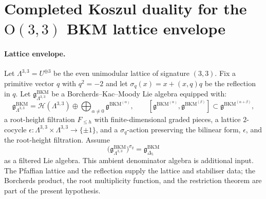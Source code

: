 \providecommand{\Lat}{\Lambda}
\providecommand{\gBKM}{\mathfrak{g}^{\mathrm{BKM}}}
\providecommand{\Bar}{\mathrm{Bar}}
\providecommand{\Cobar}{\mathrm{Cobar}}
\providecommand{\Coalg}{\mathrm{Coalg}}
\providecommand{\chir}{\mathrm{chir}}
\providecommand{\dbar}{\bar\partial}
\providecommand{\Sym}{\mathrm{Sym}}
\providecommand{\CE}{\mathrm{CE}}
\providecommand{\coCE}{\mathrm{coCE}}
\providecommand{\Hom}{\mathrm{Hom}}
\providecommand{\Lie}{\mathrm{Lie}}
\providecommand{\Op}{\mathrm{Op}}
\providecommand{\Dolb}{\mathrm{Dolb}}
\providecommand{\Ran}{\mathrm{Ran}}
\providecommand{\cD}{\mathcal{D}}
\providecommand{\cE}{\mathcal{E}}
\providecommand{\cH}{\mathcal{H}}
\providecommand{\C}{\mathbb{C}}
\providecommand{\Z}{\mathbb{Z}}
\providecommand{\R}{\mathbb{R}}
\providecommand{\kch}{\kappa_{\mathrm{ch}}}
\providecommand{\kBKM}{\kappa_{\mathrm{BKM}}}
\providecommand{\kcat}{\kappa_{\mathrm{cat}}}
\providecommand{\kfiber}{\kappa_{\mathrm{fiber}}}
\providecommand{\kchHeis}{\kappa_{\mathrm{ch}}^{\mathrm{Heis}}}
\providecommand{\HH}{\mathbb{H}}
\providecommand{\Etwo}{E_2}
\providecommand{\Ethree}{E_3}
\providecommand{\Eone}{E_1}

\section*{Completed Koszul duality for the
$\mathrm{O}(3,3)$ BKM lattice envelope}

\paragraph{Lattice envelope.}
Let $\Lat^{3,3}=U^{\oplus 3}$ be the even unimodular lattice of
signature $(3,3)$.  Fix a primitive vector $q$ with $q^2=-2$ and let
$\sigma_q(x)=x+(x,q)q$ be the reflection in $q$.  Let
$\gBKM_{\Lat^{3,3}}$ be a Borcherds--Kac--Moody Lie algebra equipped
with:
\[
  \gBKM_{\Lat^{3,3}}
  =
  \cH(\Lat^{3,3})
  \oplus
  \bigoplus_{\alpha\neq 0}\gBKM^{(\alpha)},
  \qquad
  [\gBKM^{(\alpha)},\gBKM^{(\beta)}]\subset
  \gBKM^{(\alpha+\beta)} ,
\]
a root-height filtration $F_{\leq h}$ with finite-dimensional graded
pieces, a lattice $2$-cocycle $\epsilon:\Lat^{3,3}\times\Lat^{3,3}
\to\{\pm1\}$, and a $\sigma_q$-action preserving the bilinear form,
$\epsilon$, and the root-height filtration.  Assume
\[
  \bigl(\gBKM_{\Lat^{3,3}}\bigr)^{\sigma_q}
  =
  \gBKM_{\Delta_5}
\]
as a filtered Lie algebra.  This ambient denominator algebra is
additional input.  The Pfaffian lattice and the reflection supply the
lattice and stabiliser data; the Borcherds product, the root
multiplicity function, and the restriction theorem are part of the
present hypothesis.

